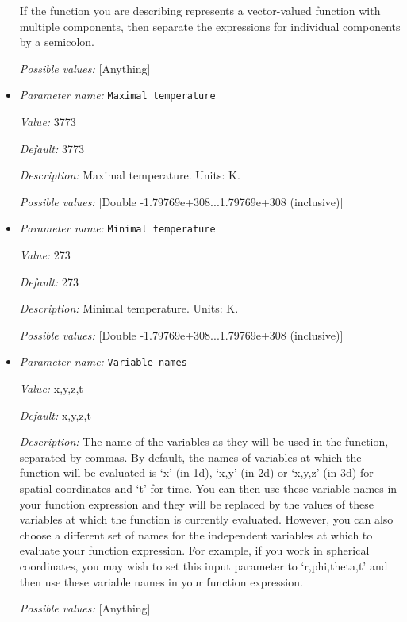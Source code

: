 \begin{itemize}
If the function you are describing represents a vector-valued function with multiple components, then separate the expressions for individual components by a semicolon.


{\it Possible values:} [Anything]
\item {\it Parameter name:} {\tt Maximal temperature}
\label{parameters:Boundary temperature model/Function/Maximal temperature}


{\it Value:} 3773


{\it Default:} 3773


{\it Description:} Maximal temperature. Units: K.


{\it Possible values:} [Double -1.79769e+308...1.79769e+308 (inclusive)]
\item {\it Parameter name:} {\tt Minimal temperature}
\label{parameters:Boundary temperature model/Function/Minimal temperature}


{\it Value:} 273


{\it Default:} 273


{\it Description:} Minimal temperature. Units: K.


{\it Possible values:} [Double -1.79769e+308...1.79769e+308 (inclusive)]
\item {\it Parameter name:} {\tt Variable names}
\label{parameters:Boundary temperature model/Function/Variable names}


{\it Value:} x,y,z,t


{\it Default:} x,y,z,t


{\it Description:} The name of the variables as they will be used in the function, separated by commas. By default, the names of variables at which the function will be evaluated is `x' (in 1d), `x,y' (in 2d) or `x,y,z' (in 3d) for spatial coordinates and `t' for time. You can then use these variable names in your function expression and they will be replaced by the values of these variables at which the function is currently evaluated. However, you can also choose a different set of names for the independent variables at which to evaluate your function expression. For example, if you work in spherical coordinates, you may wish to set this input parameter to `r,phi,theta,t' and then use these variable names in your function expression.


{\it Possible values:} [Anything]
\end{itemize}

